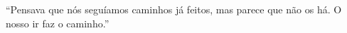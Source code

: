 ``Pensava que nós seguíamos caminhos já feitos, mas parece que não os há. O nosso ir faz o caminho.''


